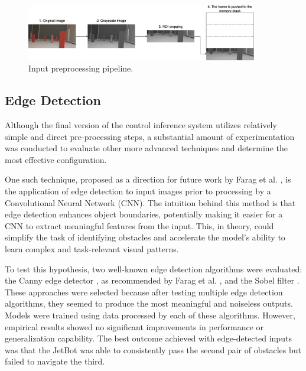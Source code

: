 \begin{figure}[htbp]
  \centering
  \includegraphics[width=0.9\textwidth]{Images/preprocessing.png}
  \caption{Input preprocessing pipeline.}
  \label{fig:preprocessing}
\end{figure}

\subsection{Edge Detection}
\label{sec:edge-detection}

Although the final version of the control inference system utilizes relatively simple and direct pre-processing steps, a substantial amount of experimentation was conducted to evaluate other more advanced techniques and determine the most effective configuration.

One such technique, proposed as a direction for future work by Farag et al. \autocite{8855753}, is the application of edge detection to input images prior to processing by a Convolutional Neural Network (CNN). The intuition behind this method is that edge detection enhances object boundaries, potentially making it easier for a CNN to extract meaningful features from the input. This, in theory, could simplify the task of identifying obstacles and accelerate the model’s ability to learn complex and task-relevant visual patterns.

To test this hypothesis, two well-known edge detection algorithms were evaluated: the Canny edge detector \autocite{canny1986computational}, as recommended by Farag et al. \autocite{8855753}, and the Sobel filter \autocite{sobel2014history}. These approaches were selected because after testing multiple edge detection algorithms, they seemed to produce the most meaningful and noiseless outputs. Models were trained using data processed by each of these algorithms. However, empirical results showed no significant improvements in performance or generalization capability. The best outcome achieved with edge-detected inputs was that the JetBot was able to consistently pass the second pair of obstacles but failed to navigate the third.

